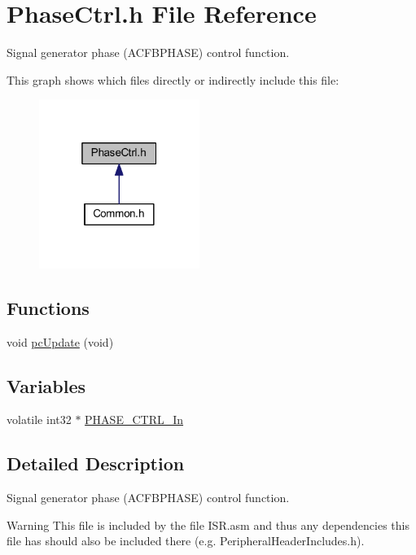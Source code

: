 \hypertarget{a00024}{\section{Phase\-Ctrl.\-h File Reference}
\label{a00024}
}


Signal generator phase (A\-C\-F\-B\-P\-H\-A\-S\-E) control function.  


This graph shows which files directly or indirectly include this file\-:
\nopagebreak
\begin{figure}[H]
\begin{center}
\leavevmode
\includegraphics[width=148pt]{a00051}
\end{center}
\end{figure}
\subsection*{Functions}
\begin{DoxyCompactItemize}
\item 
void \hyperlink{a00024_a2aab767cee769a114c9e2ab25771e447}{pc\-Update} (void)
\end{DoxyCompactItemize}
\subsection*{Variables}
\begin{DoxyCompactItemize}
\item 
volatile int32 $\ast$ \hyperlink{a00024_ac286d0874ebba5141e36971f4a7f106e}{P\-H\-A\-S\-E\-\_\-\-C\-T\-R\-L\-\_\-\-In}
\end{DoxyCompactItemize}


\subsection{Detailed Description}
Signal generator phase (A\-C\-F\-B\-P\-H\-A\-S\-E) control function. \begin{DoxyWarning}{Warning}
This file is included by the file I\-S\-R.\-asm and thus any dependencies this file has should also be included there (e.\-g. Peripheral\-Header\-Includes.\-h). 
\end{DoxyWarning}


